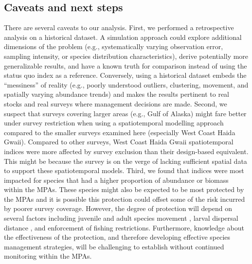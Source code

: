 \documentclass[12pt]{article}
\newcommand{\R}[1]{\label{#1}\linelabel{#1}}
\begin{document}
\begin{spacing}{1.4}
\subsection*{Caveats and next steps}

There are several caveats to our analysis.
First, we performed a retrospective analysis on a historical dataset.
A simulation approach \citep[e.g.,][]{schnute2003, regular2020, yalcin2023} could explore additional dimensions of the problem (e.g., systematically varying observation error, sampling intensity, or species distribution characteristics), derive potentially more generalizable results, and have a known truth for comparison instead of using the status quo index as a reference.
Conversely, using a historical dataset embeds the ``messiness'' of reality (e.g., poorly understood outliers, clustering, movement, and spatially varying abundance trends) and makes the results pertinent to real stocks and real surveys where management decisions are made.
Second, we suspect that surveys covering larger areas (e.g., Gulf of Alaska) might fare better under survey restriction when using a spatiotemporal modelling approach compared to the smaller surveys examined here (especially West Coast Haida Gwaii).
Compared to other surveys, West Coast Haida Gwaii spatiotemporal indices were more affected by survey exclusion than their design-based equivalent.
This might be because the survey is on the verge of lacking sufficient spatial data to support these spatiotemporal models.
Third, we found that indices were most impacted for species that had a higher proportion of abundance or biomass within the MPAs.
These species might also be expected to be most protected by the MPAs and it is possible this protection could offset some of the risk incurred by poorer survey coverage.
However, the degree of protection will depend on several factors including juvenile and adult species movement \citep[e.g.,][]{gerber2003, gruss2011}, larval dispersal distance \citep[e.g.,][]{botsford2003, planes2009}, and \R{B4} enforcement of fishing restrictions.
\R{E5} Furthermore, knowledge about the effectiveness of the protection, and therefore developing effective species management strategies, will be challenging to establish without continued monitoring within the MPAs.



\end{spacing}
\end{document}
